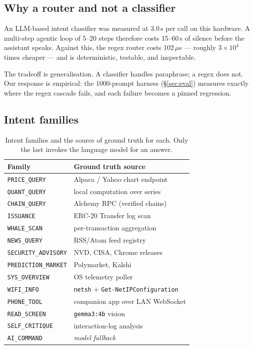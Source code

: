 \documentclass[10pt,twocolumn]{article}
\newcommand{\code}[1]{\texttt{\small #1}}
\begin{document}
\subsection{Why a router and not a classifier}

An LLM-based intent classifier was measured at 3.0\,s per call on this hardware. A
multi-step agentic loop of 5--20 steps therefore costs 15--60\,s of silence before the
assistant speaks. Against this, the regex router costs 102\,$\mu$s --- roughly
$3\times10^4$ times cheaper --- and is deterministic, testable, and inspectable.

The tradeoff is generalisation. A classifier handles paraphrase; a regex does not. Our
response is empirical: the 1000-prompt harness (\S\ref{sec:eval}) measures exactly where
the regex cascade fails, and each failure becomes a pinned regression.

\subsection{Intent families}

\begin{table}[h]
\centering\small
\begin{tabular}{@{}ll@{}}
\toprule
\textbf{Family} & \textbf{Ground truth source} \\
\midrule
\code{PRICE\_QUERY} & Alpaca / Yahoo chart endpoint \\
\code{QUANT\_QUERY} & local computation over series \\
\code{CHAIN\_QUERY} & Alchemy RPC (verified chains) \\
\code{ISSUANCE} & ERC-20 Transfer log scan \\
\code{WHALE\_SCAN} & per-transaction aggregation \\
\code{NEWS\_QUERY} & RSS/Atom feed registry \\
\code{SECURITY\_ADVISORY} & NVD, CISA, Chrome releases \\
\code{PREDICTION\_MARKET} & Polymarket, Kalshi \\
\code{SYS\_OVERVIEW} & OS telemetry poller \\
\code{WIFI\_INFO} & \code{netsh} + \code{Get-NetIPConfiguration} \\
\code{PHONE\_TOOL} & companion app over LAN WebSocket \\
\code{READ\_SCREEN} & \code{gemma3:4b} vision \\
\code{SELF\_CRITIQUE} & interaction-log analysis \\
\code{AI\_COMMAND} & \emph{model fallback} \\
\bottomrule
\end{tabular}
\caption{Intent families and the source of ground truth for each. Only the last invokes
the language model for an answer.}
\end{table}
\end{document}
